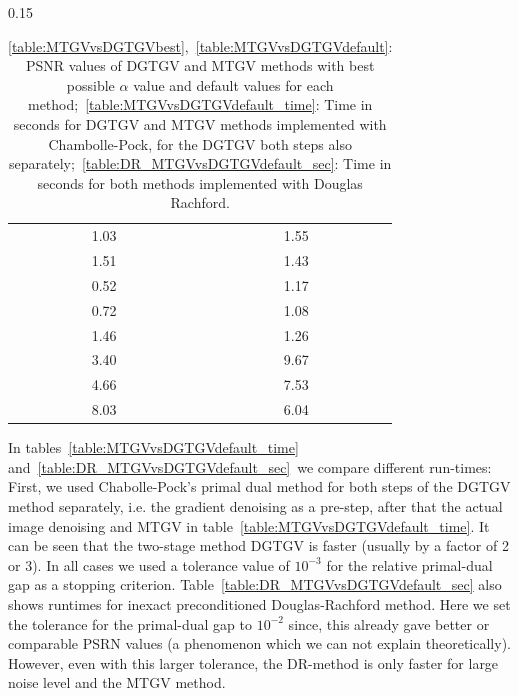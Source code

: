 \documentclass[twocolumn,envcountsame]{svjour3}
\begin{document}
\begin{table}[htb]
\begin{subtable}[t]{0.15\linewidth}
\begin{tabular}{cc}
1.03 & 1.55 \\                                                                                             
1.51 & 1.43 \\                                                                                             
\midrule
0.52 & 1.17 \\                                                                                            
0.72 & 1.08 \\                                                                                             
1.46 & 1.26 \\                                                                                             
\midrule
3.40 & 9.67 \\                                                                                             
4.66 & 7.53 \\                                                                                             
8.03 & 6.04 \\
\bottomrule   
\end{tabular}                                                                                                
\caption{Time in seconds (Douglas-Rachford).}\label{table:DR_MTGVvsDGTGVdefault_sec}                                                                      
\end{subtable}
\caption{\ref{table:MTGVvsDGTGVbest},~\ref{table:MTGVvsDGTGVdefault}: PSNR values of DGTGV and MTGV methods with best possible $\alpha$ value and default values for each method;~\ref{table:MTGVvsDGTGVdefault_time}: Time in seconds for DGTGV and MTGV methods implemented with Chambolle-Pock, for the DGTGV both steps also separately;~\ref{table:DR_MTGVvsDGTGVdefault_sec}: Time in seconds for both methods implemented with Douglas Rachford.}\label{table:MTGVvsDGTGVdefault_sec_all}                                      
\end{table} \hfill 

In tables~\ref{table:MTGVvsDGTGVdefault_time} and~\ref{table:DR_MTGVvsDGTGVdefault_sec}~we compare different run-times:
First, we used Chabolle-Pock's primal dual method for both steps of the DGTGV method separately, i.e. the gradient denoising as a pre-step, after that the actual image denoising and MTGV in table~\ref{table:MTGVvsDGTGVdefault_time}. It can be seen that the two-stage method DGTGV is faster (usually by a factor of 2 or 3).
In all cases we used a tolerance value of $10^{-3}$ for the relative primal-dual gap as a stopping criterion.
Table~\ref{table:DR_MTGVvsDGTGVdefault_sec} also shows runtimes for inexact preconditioned Douglas-Rachford method. Here we set the tolerance for the primal-dual gap to $10^{-2}$ since, this already gave better or comparable PSRN values (a phenomenon which we can not explain theoretically). However, even with this larger tolerance, the DR-method is only faster for large noise level and the MTGV method.
\end{document}
